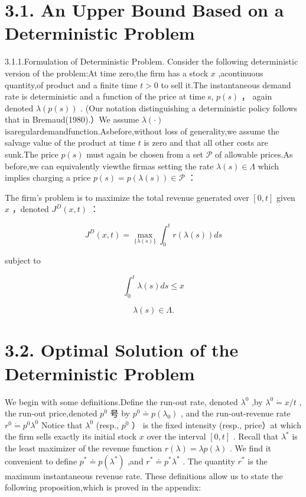 \section{3.1. An Upper Bound Based on a Deterministic
Problem}\label{an-upper-bound-based-on-a-deterministic-problem}

3.1.1.Formulation of Deterministic Problem. Consider the following
deterministic version of the problem:At time zero,the firm has a stock
\(x\) ,acontinuous quantity,of product and a finite time \(t > 0\) to
sell it.The instantaneous demand rate is deterministic and a function of
the price at time s, \(p ( s )\) ， again denoted
\(\lambda ( p ( s ) )\) . (Our notation distinguishing a deterministic
policy follows that in Bremaud(1980).）We assume \(\lambda ( \cdot )\)
isaregulardemandfunction.Asbefore,without loss of generality,we assume
the salvage value of the product at time \(t\) is zero and that all
other costs are sunk.The price \(p ( s )\) must again be chosen from a
set \(\mathcal { P }\) of allowable prices.As before,we can equivalently
viewthe firmas setting the rate \(\lambda ( s ) \in \Lambda\) which
implies charging a price
\(p ( s ) = p ( \lambda ( s ) ) \in \mathcal { P }\) ：

The firm's problem is to maximize the total revenue generated over
\([ 0 , t ]\) given \(x\) ，denoted \(J ^ { D } ( x , t )\) ：

\[
J ^ { D } ( x , t ) = \operatorname* { m a x } _ { \{ \lambda ( s ) \} } \int _ { 0 } ^ { t } r ( \lambda ( s ) ) d s
\]

subject to

\[
\int _ { 0 } ^ { t } \lambda ( s ) d s \leq x
\]

\[
\lambda ( s ) \in \Lambda .
\]

\section{3.2. Optimal Solution of the Deterministic
Problem}\label{optimal-solution-of-the-deterministic-problem}

We begin with some definitions.Define the run-out rate, denoted
\(\lambda ^ { 0 }\) ,by \(\lambda ^ { 0 } \dot { = } x / t\) , the
run-out price,denoted \(p ^ { 0 }\) 号 by
\(p ^ { 0 } \doteq p ( \lambda _ { 0 } )\) , and the run-out-revenue
rate \(r ^ { 0 } \dot { = } p ^ { 0 } \lambda ^ { 0 }\) Notice that
\(\lambda ^ { 0 }\) (resp., \(p ^ { 0 }\) ） is the fixed intensity
(resp., price）at which the firm sells exactly its initial stock \(x\)
over the interval \([ 0 , t ]\) . Recall that \(\lambda ^ { * }\) is the
least maximizer of the revenue function
\(r ( \lambda ) = \lambda p ( \lambda )\) . We find it convenient to
define \(p ^ { * } \doteq p ( \lambda ^ { * } )\) ,and
\(r ^ { \ast } \doteq p ^ { \ast } \lambda ^ { \ast }\) . The quantity
\(r ^ { * }\) is the maximum instantaneous revenue rate. These
definitions allow us to state the following proposition,which is proved
in the appendix:

